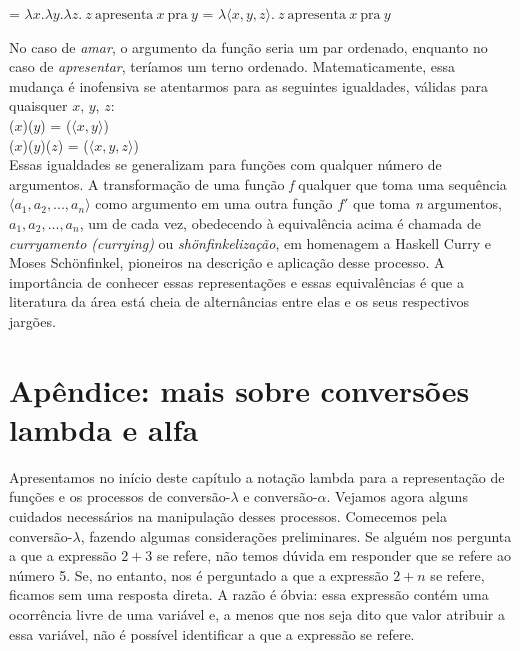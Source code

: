 \begin{exe}
	\ex
	\begin{xlist}
		\ex {} = $\lambda x.\lambda y.\lambda z.\ z\ \text{apresenta}\ x\ \text{pra}\ y$
		\ex {} = $\lambda\langle x,y,z \rangle.\ z\ \text{apresenta}\ x\ \text{pra}\ y$
	\end{xlist}
\end{exe}

\n No caso de \textit{amar}, o argumento da função seria um par ordenado, enquanto no caso de \textit{apresentar}, teríamos um terno ordenado. Matematicamente, essa mudança é inofensiva se atentarmos para as seguintes igualdades, válidas para quaisquer $x$, $y$, $z$: \\

\n {}($x$)($y$) = ($\langle x,y \rangle$)\\

\n {}($x$)($y$)($z$) =  ($\langle x,y,z \rangle$)\\ 

\n Essas igualdades se generalizam para funções com qualquer número de argumentos. A transformação de uma função \textit{f} qualquer que toma uma sequência $\langle a_{1}, a_{2},...,a_{n}\rangle$ como argumento em uma outra
função $f'$ que toma \textit{n} argumentos, $a_{1},
a_{2},...,a_{n}$, um de cada vez, obedecendo à equivalência acima é chamada de \textit{curryamento (currying)} ou \textit{shönfinkelização}, em homenagem a Haskell Curry e Moses Schönfinkel, pioneiros na descrição e aplicação desse processo. A importância de conhecer essas representações e essas equivalências é que a literatura da área está cheia de alternâncias entre elas e os seus respectivos jargões.


\section*{Apêndice: mais sobre conversões lambda e alfa}

Apresentamos no início deste capítulo a notação lambda para a representação de funções e os processos de conversão-$\lambda$ e conversão-$\alpha$. Vejamos agora alguns cuidados necessários na manipulação desses
processos. Comecemos pela conversão-$\lambda$, fazendo  algumas
considerações preliminares. Se alguém nos pergunta a que a
expressão $2+3$ se refere, não temos dúvida em responder que se
refere ao número 5. Se, no entanto, nos é perguntado a que a
expressão $2+n$ se refere, ficamos sem uma resposta direta. A
razão é óbvia: essa expressão contém uma ocorrência livre de
uma variável e, a menos que nos seja dito que valor atribuir a
essa variável, não é possível identificar a que a expressão se
refere.

